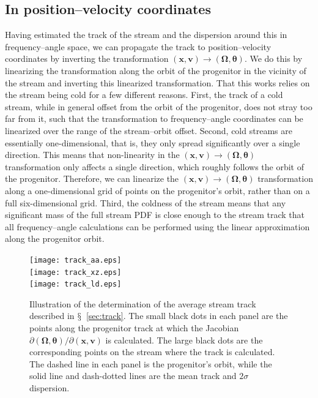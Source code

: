 \documentclass[12pt,preprint]{aastex}
\newcommand{\sectionname}{$\mathsection$}
\renewcommand{\vec}[1]{\ensuremath{\mathbf{#1}}}
\newcommand{\vecx}{\ensuremath{\vec{x}}}
\newcommand{\vecv}{\ensuremath{\vec{v}}}
\newcommand{\veco}{\ensuremath{\vec{\Omega}}}
\newcommand{\veca}{\ensuremath{\boldsymbol\theta}}
\begin{document}
\subsection{In position--velocity coordinates}\label{sec:trackxv}

Having estimated the track of the stream and the dispersion around
this in frequency--angle space, we can propagate the track to
position--velocity coordinates by inverting the transformation
$(\vecx,\vecv) \rightarrow (\veco,\veca)$. We do this by linearizing
the transformation along the orbit of the progenitor in the vicinity
of the stream and inverting this linearized transformation. That this
works relies on the stream being cold for a few different
reasons. First, the track of a cold stream, while in general offset
from the orbit of the progenitor, does not stray too far from it, such
that the transformation to frequency--angle coordinates can be
linearized over the range of the stream--orbit offset. Second, cold
streams are essentially one-dimensional, that is, they only spread
significantly over a single direction. This means that non-linearity
in the $(\vecx,\vecv) \rightarrow (\veco,\veca)$ transformation only
affects a single direction, which roughly follows the orbit of the
progenitor. Therefore, we can linearize the $(\vecx,\vecv) \rightarrow
(\veco,\veca)$ transformation along a one-dimensional grid of points
on the progenitor's orbit, rather than on a full six-dimensional
grid. Third, the coldness of the stream means that any significant
mass of the full stream PDF is close enough to the stream track that
all frequency--angle calculations can be performed using the linear
approximation along the progenitor orbit.

\begin{figure}
  \texttt{[image: track\_aa.eps]}\\
  \texttt{[image: track\_xz.eps]}\\
  \texttt{[image: track\_ld.eps]}
  \caption{Illustration of the determination of the average stream
    track described in \sectionname~\ref{sec:track}. The small black
    dots in each panel are the points along the progenitor track at
    which the Jacobian $\partial (\veco,\veca) / \partial
    (\vecx,\vecv)$ is calculated. The large black dots are the
    corresponding points on the stream where the track is
    calculated. The dashed line in each panel is the progenitor's
    orbit, while the solid line and dash-dotted lines are the mean
    track and $2\sigma$ dispersion.}\label{fig:track}
\end{figure}
\end{document}
